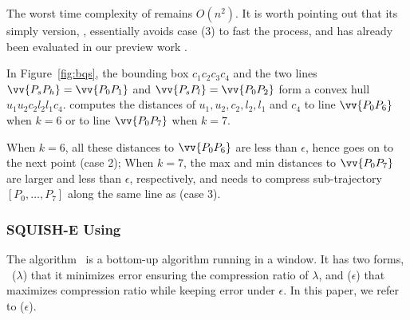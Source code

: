 The worst time complexity of \bqsa remains $O(n^2)$. 
It is worth pointing out that its simply version, \fbqsa, essentially avoids case (3) to fast the process, and \fbqsa has already been evaluated in our preview work \cite{Lin:Operb}.

\begin{example}
\label{exm-alg-bqs}
In Figure~\ref{fig:bqs}, the bounding box $c_1c_2c_3c_4$ and the two lines $\vv{P_sP_{h}} = \vv{P_0P_1}$ and $\vv{P_sP_{l}} = \vv{P_0P_2}$ form a convex hull $u_1u_2c_2l_2l_1c_4$. \bqsa computes the distances of $u_1,u_2,c_2,l_2,l_1$ and $c_4$ to line $\vv{P_0P_6}$ when $k=6$ or to line $\vv{P_0P_7}$ when $k=7$.

When $k=6$, all these distances to $\vv{P_0P_6}$  are less than $\epsilon$, hence \bqsa goes on to the next point (case 2); When $k=7$,
the max and min distances to $\vv{P_0P_7}$ are larger and less than $\epsilon$, respectively, and \bqsa needs to compress sub-trajectory $[P_0, \ldots, P_7]$ along the same line as \dpa (case 3).
\end{example}


\vspace{-0.5ex}
\subsubsection{SQUISH-E Using \sed}

The \squishe algorithm~\cite{Muckell:Compression} is a bottom-up algorithm running in a window. It has two forms, \ie~\squishe($\lambda$) that it minimizes \sed error ensuring the compression ratio of $\lambda$, and \squishe($\epsilon$) that maximizes compression ratio while keeping \sed error under $\epsilon$. In this paper, we refer to \squishe($\epsilon$).


